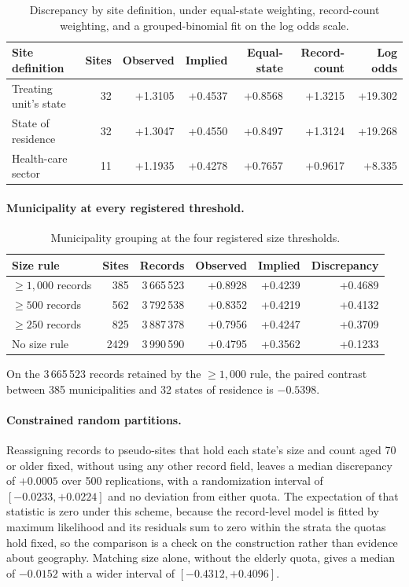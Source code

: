 \documentclass[11pt]{article}
\begin{document}
\begin{table}[h]
\centering
\caption{Discrepancy by site definition, under equal-state weighting,
record-count weighting, and a grouped-binomial fit on the log odds scale.}
\vspace{0.5\baselineskip}
\begin{tabular}{lrrrrrr}
\toprule
Site definition & Sites & Observed & Implied & Equal-state & Record-count & Log odds \\
\midrule
Treating unit's state & 32 & +1.3105 & +0.4537 & +0.8568 & +1.3215 & +19.302 \\
State of residence & 32 & +1.3047 & +0.4550 & +0.8497 & +1.3124 & +19.268 \\
Health-care sector & 11 & +1.1935 & +0.4278 & +0.7657 & +0.9617 & +8.335 \\
\bottomrule
\end{tabular}
\end{table}

\paragraph{Municipality at every registered threshold.}

\begin{table}[h]
\centering
\caption{Municipality grouping at the four registered size thresholds.}
\vspace{0.5\baselineskip}
\begin{tabular}{lrrrrr}
\toprule
Size rule & Sites & Records & Observed & Implied & Discrepancy \\
\midrule
$\geq 1{,}000$ records & 385 & 3\,665\,523 & +0.8928 & +0.4239 & +0.4689 \\
$\geq 500$ records & 562 & 3\,792\,538 & +0.8352 & +0.4219 & +0.4132 \\
$\geq 250$ records & 825 & 3\,887\,378 & +0.7956 & +0.4247 & +0.3709 \\
No size rule & 2429 & 3\,990\,590 & +0.4795 & +0.3562 & +0.1233 \\
\bottomrule
\end{tabular}
\end{table}

On the 3\,665\,523 records retained by the
$\geq 1{,}000$ rule, the paired contrast between
385 municipalities and
32 states of residence is
$-0.5398$.

\paragraph{Constrained random partitions.}
Reassigning records to pseudo-sites that hold each state's size and count aged
70 or older fixed, without using any other record field, leaves a median
discrepancy of $+0.0005$ over
500 replications, with a randomization interval of
$[-0.0233,
+0.0224]$ and no deviation from either
quota.  The expectation of that statistic is zero under this scheme, because
the record-level model is fitted by maximum likelihood and its residuals sum to
zero within the strata the quotas hold fixed, so the comparison is a check on
the construction rather than evidence about geography.  Matching size alone,
without the elderly quota, gives a median of
$-0.0152$ with a wider interval of
$[-0.4312,
+0.4096]$.
\end{document}
